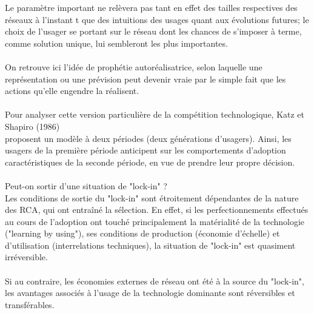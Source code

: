 \documentclass[a4paper, 10pt]{article}
\begin{document}
Le paramètre important ne relèvera pas tant en effet des tailles respectives des réseaux à l'instant t
que des intuitions des usages quant aux évolutions futures;
le choix de l'usager se portant sur le réseau dont les chances de s'imposer à terme,
comme solution unique, lui sembleront les plus importantes.\\ \\
On retrouve ici l'idée de prophétie autoréalisatrice,
selon laquelle une représentation ou une prévision peut devenir vraie par le simple fait que les actions qu'elle engendre la réalisent.\\ \\
Pour analyser cette version particulière de la compétition technologique,
Katz et Shapiro (1986)\\proposent un modèle à deux périodes (deux générations d'usagers).
Ainsi, les usagers de la première période anticipent sur les comportements d'adoption caractéristiques de la seconde période,
en vue de prendre leur propre décision.\\ \\
Peut-on sortir d'une situation de "lock-in" ?\\
Les conditions de sortie du "lock-in" sont étroitement dépendantes de la nature des RCA, qui ont entraîné la sélection.
En effet, si les perfectionnements effectués au cours de l'adoption ont touché principalement la matérialité de la technologie
("learning by using"), ses conditions de production (économie d'échelle) et d'utilisation (interrelations techniques),
la situation de "lock-in" est quasiment irréversible.\\ \\
Si au contraire, les économies externes de réseau ont été à la source du "lock-in",
les avantages associés à l'usage de la technologie dominante sont réversibles et transférables.
\newpage
\end{document}
